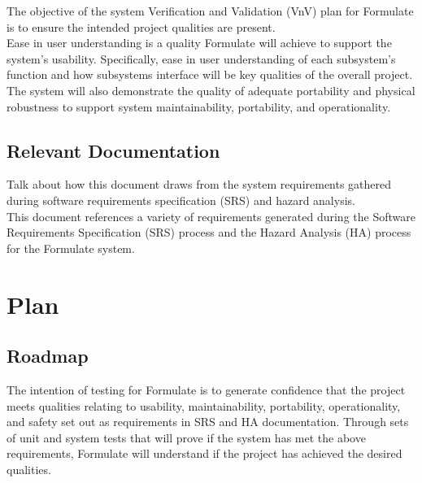 \documentclass[12pt, titlepage]{article}
\begin{document}
  The objective of the system Verification and Validation (VnV) plan for Formulate is to ensure the intended project qualities are present.\\

  Ease in user understanding is a quality Formulate will achieve to support the system's usability.  Specifically, ease in user understanding of each subsystem's function and how subsystems interface will be key qualities of the overall project.\\

  The system will also demonstrate the quality of adequate portability and physical robustness to support system maintainability, portability, and operationality.\\



\subsection{Relevant Documentation}


  Talk about how this document draws from the system requirements gathered during software requirements specification (SRS) and hazard analysis.\\

  This document references a variety of requirements generated during the Software Requirements Specification (SRS) process and the Hazard Analysis (HA) process for the Formulate system. \\


\newpage
\section{Plan}

  
  \subsection{Roadmap}

  The intention of testing for Formulate is to generate confidence that the project meets qualities relating to usability, maintainability, portability, operationality, and safety set out as requirements in SRS and HA documentation. Through sets of unit and system tests that will prove if the system has met the above requirements, Formulate will understand if the project has achieved the desired qualities.\\
\end{document}
